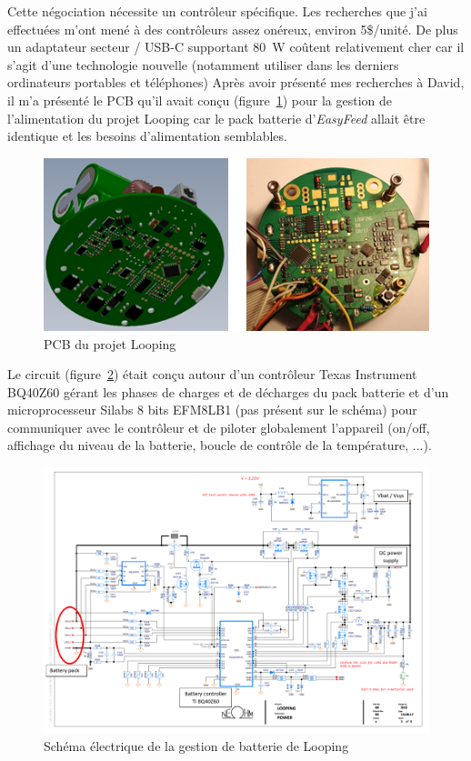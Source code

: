 \documentclass[a4paper, 12pt]{report}
\begin{document}
Cette négociation nécessite un contrôleur spécifique. Les recherches que j’ai effectuées m’ont mené à des contrôleurs assez onéreux, environ 5\$/unité. De plus un adaptateur secteur / USB-C supportant \SI{80}{\watt} coûtent relativement cher car il s'agit d'une technologie nouvelle (notamment utiliser dans les derniers ordinateurs portables et téléphones)
Après avoir présenté mes recherches à David, il m'a présenté le PCB qu’il avait conçu (figure~\ref{fig:looping_pcb}) pour la gestion de l’alimentation du projet Looping car le pack batterie d'\emph{EasyFeed} allait être identique et les besoins d'alimentation semblables.

\begin{figure}[H]
\centering
\includegraphics[scale=1]{figures/photos/looping_pcb.jpg}
\caption{PCB du projet Looping}
\label{fig:looping_pcb}
\end{figure}

Le circuit (figure~\ref{fig:looping_charger}) était conçu autour d'un contrôleur Texas Instrument BQ40Z60 gérant les phases de charges et de décharges du pack batterie et d'un microprocesseur Silabs 8 bits EFM8LB1 (pas présent sur le schéma) pour communiquer avec le contrôleur et de piloter globalement l'appareil (on/off, affichage du niveau de la batterie, boucle de contrôle de la température, ...).

\begin{figure}[h]
\centering
\includegraphics[scale=0.6]{figures/screenshots/battery_charger.png}
\caption{Schéma électrique de la gestion de batterie de Looping}
\label{fig:looping_charger}
\end{figure}
\end{document}
